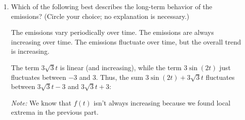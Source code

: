 \documentclass{article}
\begin{document}
\begin{enumerate}
\begin{enumerate}
\begin{solution}
      \begin{checkanswer}
        A good check for equation (\ref{spring2011-midterm1-3-eq1}) is
        to think about the graph of $\cos(2t)$; you should know what
        this looks like, and the graph confirms that $\cos(2t) = -
        \frac{\sqrt{3}}{2}$ should have 4 solutions in $[0, 2 \pi]$.
      \end{checkanswer}
\fi
    \end{solution}

  \item    
    Which of the following best describes the long-term behavior of the
    emissions?  (Circle your choice; no explanation is necessary.)
    \begin{enumerate}[label=\protect\maybecircle{\Alph*.}]
    \plainitem The emissions vary periodically over time.
    \plainitem The emissions are always increasing over time.
    \circleitem The emissions fluctuate over time, but the overall trend
      is increasing.
    \end{enumerate}

    \begin{solution}
      The term $3 \sqrt{3} t$ is linear (and increasing), while the term
      $3 \sin (2t)$ just fluctuates between $-3$ and $3$.  Thus, the sum
      $3 \sin(2t) + 3 \sqrt{3} t$ fluctuates between $3 \sqrt{3} t - 3$
      and $3 \sqrt{3} t + 3$:
      \begin{center}
      \end{center}
      \emph{Note:} We know that $f(t)$ isn't always increasing because we
      found local extrema in the previous part. 
    \end{solution}

    \pspace{0.35in}
  \end{enumerate}

  \pspace{\newpage}


\end{enumerate}
\end{document}

